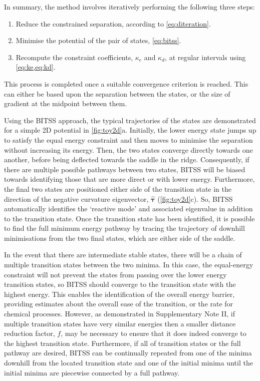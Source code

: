 \documentclass[twocolumn,10pt]{revtex4}
\newcommand{\bm}[1]{\boldsymbol{\mathbf{#1}}}
\begin{document}
In summary, the method involves iteratively performing the following three steps:
\begin{enumerate}
  \item Reduce the constrained separation, according to \cref{eq:diteration}.
  \item Minimise the potential of the pair of states, \cref{eq:bitss}.
  \item Recompute the constraint coefficients, $\kappa_e$ and $\kappa_d$, at regular intervals using \cref{eq:ke,eq:kd}.
\end{enumerate}
This process is completed once a suitable convergence criterion is reached.
This can either be based upon the separation between the states, or the size of gradient at the midpoint between them.

Using the BITSS approach, the typical trajectories of the states are demonstrated for a simple 2D potential in \cref{fig:toy2d}a.
Initially, the lower energy state jumps up to satisfy the equal energy constraint and then moves to minimise the separation without increasing its energy.
Then, the two states converge directly towards one another, before being deflected towards the saddle in the ridge.
Consequently, if there are multiple possible pathways between two states, BITSS will be biased towards identifying those that are more direct or with lower energy.
Furthermore, the final two states are positioned either side of the transition state in the direction of the negative curvature eigenvector, $\bm{\hat{\tau}}$ (\cref{fig:toy2d}c).
So, BITSS automatically identifies the `reactive mode' and associated eigenvalue in addition to the transition state.
Once the transition state has been identified, it is possible to find the full minimum energy pathway by tracing the trajectory of downhill minimisations from the two final states, which are either side of the saddle.

In the event that there are intermediate stable states, there will be a chain of multiple transition states between the two minima.
In this case, the equal-energy constraint will not prevent the states from passing over the lower energy transition states, so BITSS should converge to the transition state with the highest energy.
This enables the identification of the overall energy barrier, providing estimates about the overall ease of the transition, or the rate for chemical processes.
However, as demonstrated in Supplementary Note II, if multiple transition states have very similar energies then a smaller distance reduction factor, $f$, may be necessary to ensure that it does indeed converge to the highest transition state.
Furthermore, if all of transition states or the full pathway are desired, BITSS can be continually repeated from one of the minima downhill from the located transition state and one of the initial minima until the initial minima are piecewise connected by a full pathway.
\end{document}
